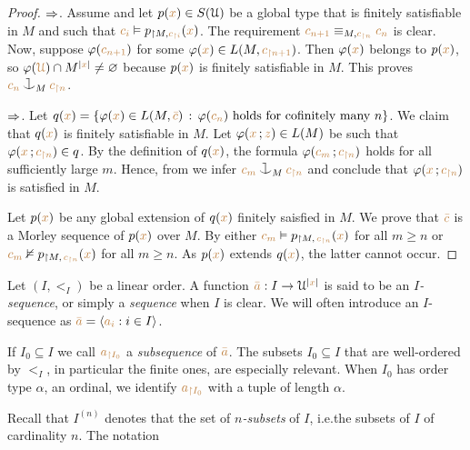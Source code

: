 \documentclass[creche.tex]{subfiles}
\begin{document}
\begin{proof}
$\Rightarrow$.
Assume  and let $p({\color{brown} x})\in S(\EuScript U)$ be a global type that is finitely satisfiable in $M$ and such that ${\color{brown} c_i}\vDash p_{\restriction M,{\color{brown} c_{\restriction i}}}({\color{brown} x})$.
The requirement ${\color{brown} c_{n+1}}\equiv_{M,{\color{brown} c_{\restriction n}}} {\color{brown} c_n}$ is clear.
Now, suppose $\varphi({\color{brown} c_{n+1}})$ for some $\varphi({\color{brown} x})\in L(M,{\color{brown} c_{\restriction n+1}})$.
Then $\varphi({\color{brown} x})$ belongs to $p({\color{brown} x})$, so $\varphi({\color{brown}\EuScript U})\cap M^{|{\color{brown} x}|}\neq\varnothing$ because $p({\color{brown} x})$ is finitely satisfiable in $M$. This proves ${\mr c_n}\cnonfork_M{\mr c_{\restriction n}}$.

$\Rightarrow$.
Let $q({\color{brown} x})=\{\varphi({\color{brown} x})\in L(M, {\color{brown}\bar c})\,:\, \varphi({\color{brown} c_n}) \textrm{ holds for cofinitely many } n\}$.
%
We claim that $q({\color{brown} x})$ is finitely satisfiable in $M$.
%
Let $\varphi({\color{brown} x}\,;{\color{brown} z})\in L(M)$ be such that $\varphi({\color{brown} x}\,;{\color{brown} c_{\restriction n}})\in q$.
%
By the definition of $q({\color{brown} x})$, the formula $\varphi({\color{brown} c_m}\,;{\color{brown} c_{\restriction n}})$ holds for all sufficiently large $m$.
%
Hence, from  we infer ${\mr c_m}\cnonfork_M{\mr c_{\restriction n}}$ and conclude that $\varphi({\color{brown} x}\,;{\color{brown} c_{\restriction n}})$ is satisfied in $M$.

Let $p({\color{brown} x})$ be any global extension of $q({\color{brown} x})$ finitely saisfied in $M$. 
%
We prove that ${\color{brown}\bar c}$ is a Morley sequence of $p({\color{brown} x})$ over $M$.
%
By  either ${\color{brown} c_m}\vDash p_{\restriction  M,\,{\color{brown} c_{\restriction n}}}({\color{brown} x})$ for all $m\ge n$ or ${\color{brown} c_m}\nvDash p_{\restriction  M,\,{\color{brown} c_{\restriction n}}}({\color{brown} x})$ for all $m\ge n$.
%
As $p({\color{brown} x})$ extends $q({\color{brown} x})$, the latter cannot occur.
\end{proof}

Let $(I,<_I)$ be a linear order.
A function ${\color{brown}\bar a}:I\to\EuScript U^{|{\color{brown} x}|}$ is said to be an \emph{$I$-sequence}, or simply a \emph{sequence\/} when $I$ is clear.
We will often introduce an $I$-sequence as ${\color{brown}\bar a}=\langle{\color{brown}a_i}: i\in I\rangle$.

If $I_0\subseteq I$ we call ${\color{brown} a_{\restriction I_0}}$ a \emph{subsequence\/} of ${\color{brown}\bar a}$.
The subsets $I_0\subseteq I$ that are well-ordered by $<_I$, in particular the finite ones, are especially relevant.
When $I_0$ has order type $\alpha$, an ordinal, we identify ${\color{brown} a_{\restriction I_0}}$ with a tuple of length $\alpha$.

Recall that \emph{$I^{(n)}$} denotes that the set of \emph{$n$-subsets\/} of $I$,  i.e.\@ the subsets of $I$ of cardinality $n$.
The notation \smallskip
\end{document}
